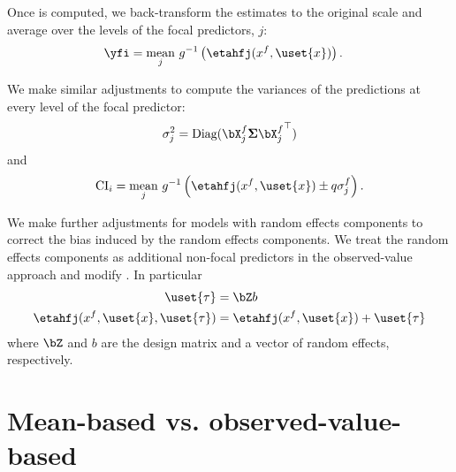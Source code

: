 Once  is computed, we back-transform the estimates to the original scale and average over the levels of the focal predictors, $j$:
%
\begin{align}\label{eq:pop_response} 
\yfi  &= \underset{j}{\textrm{mean}} ~ g^{-1} \left(\etahfj(x^f, \uset{x})\right).
\end{align}
%

We make similar adjustments to compute the variances of the predictions at every level of the focal predictor:
%
\begin{align}
\sigma_j^2 = \textrm{Diag}(\bX^{f}_j \boldsymbol{\Sigma} {\bX^{f}_j}^\top)
\end{align}
%
and
%
\begin{align}
\mathrm{CI}_i = \underset{j}{\textrm{mean}} ~ g^{-1} \left(\etahfj(x^f, \uset{x}) \pm q\sigma^f_{j}\right).
\end{align}
%

We make further adjustments for models with random effects components to correct the bias induced by the random effects components. We treat the random effects components as additional non-focal predictors in the observed-value approach and modify . In particular
%
\begin{align}\label{eq:pop_eta_re} 
\uset{\tau} &= \bZ b \nonumber \\
\etahfj(x^f, \uset{x}, \uset{\tau})  &= \etahfj(x^f, \uset{x}) + \uset{\tau}
\end{align}
where $\bZ$ and $b$ are the design matrix and a vector of random effects, respectively.

\section{Mean-based vs. observed-value-based}

